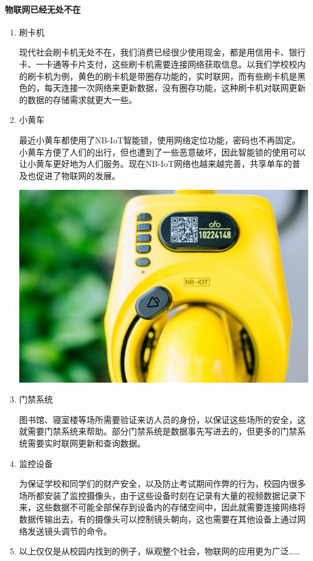 \documentclass{ctexart}
\begin{document}
\paragraph{物联网已经无处不在}
\begin{enumerate}
	\item 刷卡机

	现代社会刷卡机无处不在，我们消费已经很少使用现金，都是用信用卡、银行卡、一卡通等卡片支付，这些刷卡机需要连接网络获取信息。以我们学校校内的刷卡机为例，黄色的刷卡机是带圈存功能的，实时联网，而有些刷卡机是黑色的，每天连接一次网络来更新数据，没有圈存功能，这种刷卡机对联网更新的数据的存储需求就更大一些。
	\item 小黄车

	最近小黄车都使用了NB-IoT智能锁，使用网络定位功能，密码也不再固定。小黄车方便了人们的出行，但也遭到了一些恶意破坏，因此智能锁的使用可以让小黄车更好地为人们服务。现在NB-IoT网络也越来越完善，共享单车的普及也促进了物联网的发展。

	\includegraphics[width=\textwidth]{NB-IoT.jpg}
	\item 门禁系统

	图书馆、寝室楼等场所需要验证来访人员的身份，以保证这些场所的安全，这就需要门禁系统来帮助。部分门禁系统是数据事先写进去的，但更多的门禁系统需要实时联网更新和查询数据。
	\item 监控设备

	为保证学校和同学们的财产安全，以及防止考试期间作弊的行为，校园内很多场所都安装了监控摄像头，由于这些设备时刻在记录有大量的视频数据记录下来，这些数据不可能全部保存到设备内的存储空间中，因此就需要连接网络将数据传输出去，有的摄像头可以控制镜头朝向，这也需要在其他设备上通过网络发送镜头调节的命令。
	\item 以上仅仅是从校园内找到的例子，纵观整个社会，物联网的应用更为广泛……
\end{enumerate}
\end{document}
